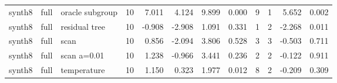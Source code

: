 \begin{tabular}{lllrrrrrrrrr}
synth8 & full & oracle subgroup & 10 & 7.011 & 4.124 & 9.899 & 0.000 & 9 & 1 & 5.652 & 0.002 \\
synth8 & full & residual tree & 10 & -0.908 & -2.908 & 1.091 & 0.331 & 1 & 2 & -2.268 & 0.011 \\
synth8 & full & scan & 10 & 0.856 & -2.094 & 3.806 & 0.528 & 3 & 3 & -0.503 & 0.711 \\
synth8 & full & scan a=0.01 & 10 & 1.238 & -0.966 & 3.441 & 0.236 & 2 & 2 & -0.122 & 0.911 \\
synth8 & full & temperature & 10 & 1.150 & 0.323 & 1.977 & 0.012 & 8 & 2 & -0.209 & 0.309 \\
\bottomrule
\end{tabular}
